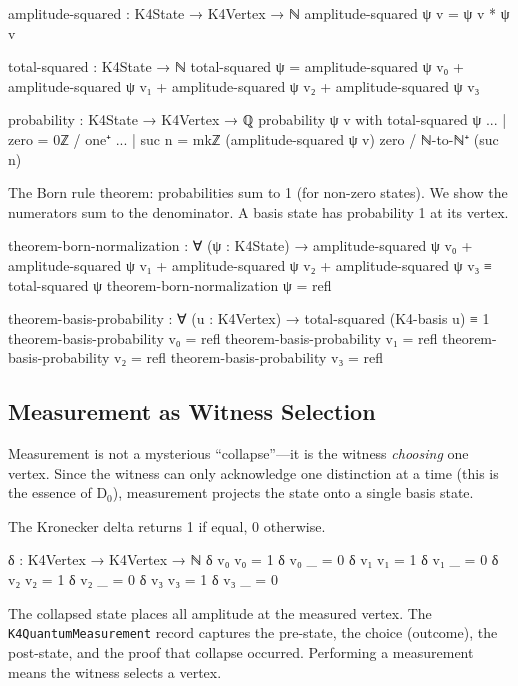 \documentclass[11pt,a4paper]{book}
\begin{document}
\begin{code}
amplitude-squared : K4State → K4Vertex → ℕ
amplitude-squared ψ v = ψ v * ψ v

total-squared : K4State → ℕ
total-squared ψ = amplitude-squared ψ v₀ + amplitude-squared ψ v₁ 
                + amplitude-squared ψ v₂ + amplitude-squared ψ v₃

probability : K4State → K4Vertex → ℚ
probability ψ v with total-squared ψ
... | zero    = 0ℤ / one⁺
... | suc n   = mkℤ (amplitude-squared ψ v) zero / ℕ-to-ℕ⁺ (suc n)
\end{code}

The Born rule theorem: probabilities sum to 1 (for non-zero states). We show the numerators sum to the denominator. A basis state has probability 1 at its vertex.

\begin{code}
theorem-born-normalization : ∀ (ψ : K4State) →
  amplitude-squared ψ v₀ + amplitude-squared ψ v₁ 
  + amplitude-squared ψ v₂ + amplitude-squared ψ v₃ 
  ≡ total-squared ψ
theorem-born-normalization ψ = refl

theorem-basis-probability : ∀ (u : K4Vertex) →
  total-squared (K4-basis u) ≡ 1
theorem-basis-probability v₀ = refl
theorem-basis-probability v₁ = refl
theorem-basis-probability v₂ = refl
theorem-basis-probability v₃ = refl
\end{code}

\subsection{Measurement as Witness Selection}

Measurement is not a mysterious ``collapse''---it is the witness 
\emph{choosing} one vertex. Since the witness can only acknowledge one 
distinction at a time (this is the essence of D$_0$), measurement 
projects the state onto a single basis state.

The Kronecker delta returns 1 if equal, 0 otherwise.

\begin{code}
δ : K4Vertex → K4Vertex → ℕ
δ v₀ v₀ = 1
δ v₀ _  = 0
δ v₁ v₁ = 1
δ v₁ _  = 0
δ v₂ v₂ = 1
δ v₂ _  = 0
δ v₃ v₃ = 1
δ v₃ _  = 0
\end{code}

The collapsed state places all amplitude at the measured vertex. The \texttt{K4QuantumMeasurement} record captures the pre-state, the choice (outcome), the post-state, and the proof that collapse occurred. Performing a measurement means the witness selects a vertex.
\end{document}
